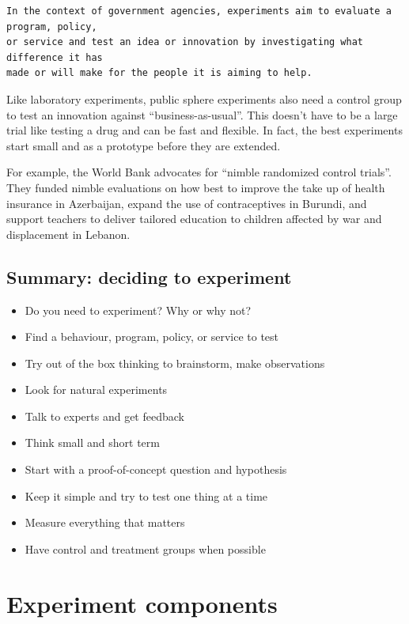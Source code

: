 \documentclass[]{book}
\providecommand{\tightlist}{%
  \setlength{\itemsep}{0pt}\setlength{\parskip}{0pt}}
\begin{document}
\begin{verbatim}
In the context of government agencies, experiments aim to evaluate a program, policy, 
or service and test an idea or innovation by investigating what difference it has 
made or will make for the people it is aiming to help. 
\end{verbatim}

Like laboratory experiments, public sphere experiments also need a control group to test an innovation against ``business-as-usual''. This doesn't have to be a large trial like testing a drug and can be fast and flexible. In fact, the best experiments start small and as a prototype before they are extended.

For example, the World Bank advocates for ``nimble randomized control trials''. They funded nimble evaluations on how best to improve the take up of health insurance in Azerbaijan, expand the use of contraceptives in Burundi, and support teachers to deliver tailored education to children affected by war and displacement in Lebanon.

\hypertarget{summary-deciding-to-experiment}{%
\section{Summary: deciding to experiment}\label{summary-deciding-to-experiment}}

\begin{itemize}
\tightlist
\item
  Do you need to experiment? Why or why not?
\item
  Find a behaviour, program, policy, or service to test
\item
  Try out of the box thinking to brainstorm, make observations
\item
  Look for natural experiments
\item
  Talk to experts and get feedback
\item
  Think small and short term
\item
  Start with a proof-of-concept question and hypothesis
\item
  Keep it simple and try to test one thing at a time
\item
  Measure everything that matters
\item
  Have control and treatment groups when possible
\end{itemize}

\hypertarget{experiment-components}{%
\chapter{Experiment components}\label{experiment-components}}
\end{document}
